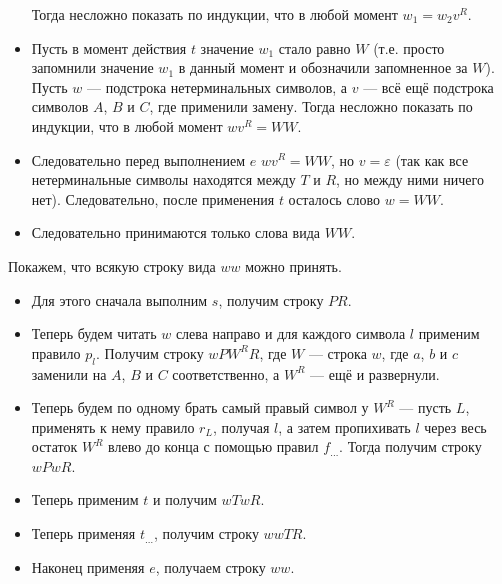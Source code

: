 \documentclass[12pt,a4paper]{article}
\begin{document}
\begin{problem}{5}
\begin{itemize}
                Тогда несложно показать по индукции, что в любой момент $w_1 = w_2 v^R$.
            \item Пусть в момент действия $t$ значение $w_1$ стало равно $W$ (т.е. просто запомнили значение $w_1$ в данный момент и обозначили запомненное за $W$). Пусть $w$ --- подстрока нетерминальных символов, а $v$ --- всё ещё подстрока символов $A$, $B$ и $C$, где применили замену. Тогда несложно показать по индукции, что в любой момент $w v^R = WW$.
            \item Следовательно перед выполнением $e$ $wv^R = WW$, но $v = \varepsilon$ (так как все нетерминальные символы находятся между $T$ и $R$, но между ними ничего нет). Следовательно, после применения $t$ осталось слово $w = WW$.
            \item Следовательно принимаются только слова вида $WW$.
        \end{itemize}

        Покажем, что всякую строку вида $ww$ можно принять.
        \begin{itemize}
            \item Для этого сначала выполним $s$, получим строку $PR$.
            \item Теперь будем читать $w$ слева направо и для каждого символа $l$ применим правило $p_l$. Получим строку $wPW^RR$, где $W$ --- строка $w$, где $a$, $b$ и $c$ заменили на $A$, $B$ и $C$ соответственно, а $W^R$ --- ещё и развернули.
            \item Теперь будем по одному брать самый правый символ у $W^R$ --- пусть $L$, применять к нему правило $r_L$, получая $l$, а затем пропихивать $l$ через весь остаток $W^R$ влево до конца с помощью правил $f_{\dots}$. Тогда получим строку $wPwR$.
            \item Теперь применим $t$ и получим $wTwR$.
            \item Теперь применяя $t_{\dots}$, получим строку $wwTR$.
            \item Наконец применяя $e$, получаем строку $ww$.
        \end{itemize}
    \end{problem}
\end{document}

